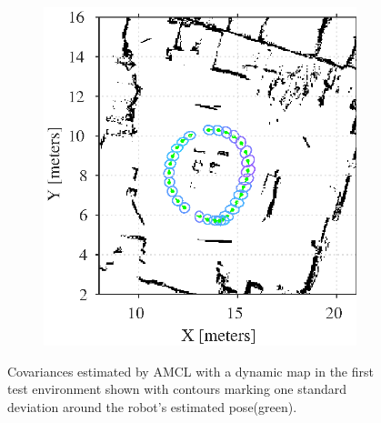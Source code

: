 \begin{figure}[htbp]
	\centering
	\begin{subfigure}[t]{0.55\textwidth}
		\includegraphics[scale=1.0]{chapters/evaluation/figures/localization_dynamic_map1}		
	\end{subfigure}
	\begin{subfigure}[t]{0.2\textwidth}
	\end{subfigure}
	\caption{Covariances estimated by AMCL with a dynamic map in the first test environment shown with contours marking one standard deviation around the robot's estimated pose(green).}
	\label{fig:amcl_covariance_dynamic1}
\end{figure}

